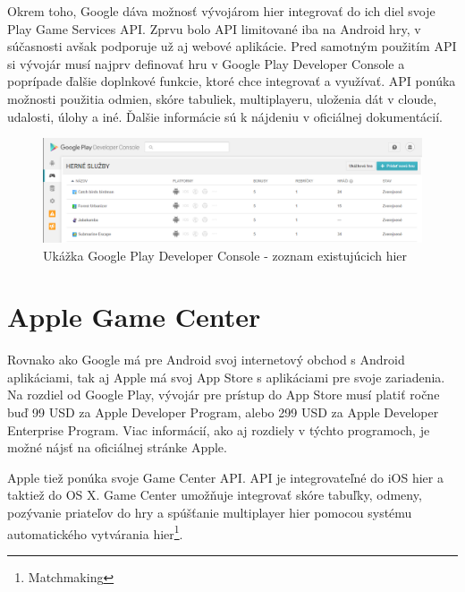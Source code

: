 Okrem toho, Google dáva možnosť vývojárom hier integrovať do ich diel svoje Play Game Services API. Zprvu bolo API limitované iba na Android hry, v súčasnosti avšak podporuje už aj webové aplikácie. Pred samotným použitím API si vývojár musí najprv definovať hru v Google Play Developer Console a poprípade ďalšie doplnkové funkcie, ktoré chce integrovať a využívať. API ponúka možnosti použitia odmien, skóre tabuliek, multiplayeru, uloženia dát v cloude, udalosti, úlohy a iné. Ďalšie informácie sú k nájdeniu v oficiálnej dokumentácií.   
\begin{figure}[h]
  \centering
  \includegraphics[scale=0.32]{fig/google-play.png}
  \caption{Ukážka Google Play Developer Console  - zoznam existujúcich hier}
  \label{fig:google-play}
\end{figure}

\section{Apple Game Center}
Rovnako ako Google má pre Android svoj internetový obchod s Android aplikáciami, tak aj Apple má svoj App Store s aplikáciami pre svoje zariadenia. Na rozdiel od Google Play, vývojár pre prístup do App Store musí platiť ročne buď 99 USD za Apple Developer Program, alebo 299 USD za Apple Developer Enterprise Program. Viac informácií, ako aj rozdiely v týchto programoch, je možné nájsť na oficiálnej stránke Apple.  

Apple tiež ponúka svoje Game Center API. API je integrovateľné do iOS hier a taktiež do OS X. Game Center umožňuje integrovať skóre tabuľky, odmeny, pozývanie priateľov do hry a spúšťanie multiplayer hier pomocou systému automatického vytvárania hier\footnote{Matchmaking}.

